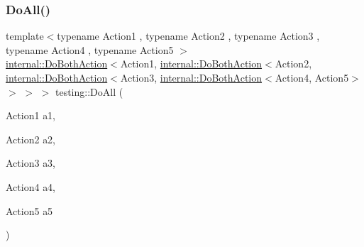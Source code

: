 \mbox{\label{namespacetesting_a794c41d43373d7af9cebbc7f1c5e4a57}} 
\subsubsection{\texorpdfstring{DoAll()}{DoAll()}\hspace{0.1cm}{\footnotesize\ttfamily [4/10]}}
{\footnotesize\ttfamily template$<$typename Action1 , typename Action2 , typename Action3 , typename Action4 , typename Action5 $>$ \\
\mbox{\hyperlink{classtesting_1_1internal_1_1_do_both_action}{internal\+::\+Do\+Both\+Action}}$<$Action1, \mbox{\hyperlink{classtesting_1_1internal_1_1_do_both_action}{internal\+::\+Do\+Both\+Action}}$<$Action2, \mbox{\hyperlink{classtesting_1_1internal_1_1_do_both_action}{internal\+::\+Do\+Both\+Action}}$<$Action3, \mbox{\hyperlink{classtesting_1_1internal_1_1_do_both_action}{internal\+::\+Do\+Both\+Action}}$<$Action4, Action5$>$ $>$ $>$ $>$ testing\+::\+Do\+All (\begin{DoxyParamCaption}\item[{Action1}]{a1,  }\item[{Action2}]{a2,  }\item[{Action3}]{a3,  }\item[{Action4}]{a4,  }\item[{Action5}]{a5 }\end{DoxyParamCaption})\hspace{0.3cm}{\ttfamily [inline]}}

\mbox{\label{namespacetesting_aa6c87c8d7520fb333f1559487d3e06e9}} 
